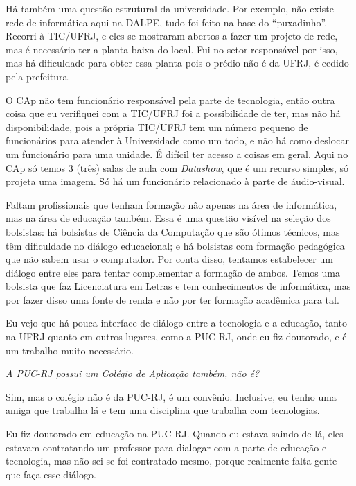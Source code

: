 Há também uma questão estrutural da universidade. Por exemplo, não existe rede de informática aqui na DALPE, tudo foi feito na base do “puxadinho”. Recorri à TIC/UFRJ, e eles se mostraram abertos a fazer um projeto de rede, mas é necessário ter a planta baixa do local. Fui no setor responsável por isso, mas há dificuldade para obter essa planta pois o prédio não é da UFRJ, é cedido pela prefeitura.

O CAp não tem funcionário responsável pela parte de tecnologia, então outra coisa que eu verifiquei com a TIC/UFRJ foi a possibilidade de ter, mas não há disponibilidade, pois a própria TIC/UFRJ tem um número pequeno de funcionários para atender à Universidade como um todo, e não há como deslocar um funcionário para uma unidade. É difícil ter acesso a coisas em geral. Aqui no CAp só temos 3 (três) salas de aula com \textit{Datashow}, que é um recurso simples, só projeta uma imagem. Só há um funcionário relacionado à parte de áudio-visual.

Faltam profissionais que tenham formação não apenas na área de informática, mas na área de educação também. Essa é uma questão visível na seleção dos bolsistas: há bolsistas de Ciência da Computação que são ótimos técnicos, mas têm dificuldade no diálogo educacional; e há bolsistas com formação pedagógica que não sabem usar o computador. Por conta disso, tentamos estabelecer um diálogo entre eles para tentar complementar a formação de ambos. Temos uma bolsista que faz Licenciatura em Letras e tem conhecimentos de informática, mas por fazer disso uma fonte de renda e não por ter formação acadêmica para tal.

Eu vejo que há pouca interface de diálogo entre a tecnologia e a educação, tanto na UFRJ quanto em outros lugares, como a PUC-RJ, onde eu fiz doutorado, e é um trabalho muito necessário.

\textit{A PUC-RJ possui um Colégio de Aplicação também, não é?}

Sim, mas o colégio não é da PUC-RJ, é um convênio. Inclusive, eu tenho uma amiga que trabalha lá e tem uma disciplina que trabalha com tecnologias.

Eu fiz doutorado em educação na PUC-RJ. Quando eu estava saindo de lá, eles estavam contratando um professor para dialogar com a parte de educação e tecnologia, mas não sei se foi contratado mesmo, porque realmente falta gente que faça esse diálogo.

\label{anx:LABEL_ANX_C}

